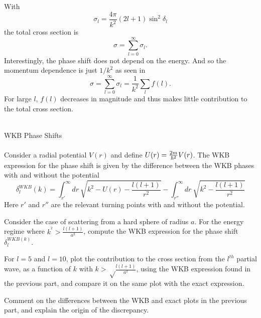 \documentclass[10pt,letterpaper]{article}
\begin{document}
	\item
	With
	\[
		\sigma_l = \frac{4\pi}{k^2}(2l+1)\sin^2\delta_l
	\]
	the total cross section is
	\[
		\sigma = \sum_{l=0}^\infty \sigma_l .
	\]
	Interestingly, the phase shift does not depend on the energy. And so the momentum dependence is
	just $1/k^2$ as seen in 
	\[
		\sigma = \sum_{l=0}^\infty \sigma_l = \frac{1}{k^2}\sum_l f(l).
	\]
	For large $l$, $f(l)$ decreases in magnitude and thus makes little contribution to the total
	cross section. 
	\\
	\\
	\eenum 

	\item{WKB Phase Shifts}
	\\ \\
	Consider a radial potential $V(r)$ and define $U(r) = \frac{2m}{\hbar^2}V(r)$. The WKB expression for the phase 
	shift is given by the difference between the WKB phases with and without the potential
	\[
		\delta_l^{WKB}(k) = \int_{r'}^{\infty} dr\ \sqrt{k^2-U(r)-\frac{l(l+1)}{r^2}} - \int_{r''}^{\infty} dr\ 
		\sqrt{k^2-\frac{l(l+1)}{r^2}}
	\]
	Here $r'$ and $r''$ are the relevant turning points with and without the potential.
	\benum
	\item
	Consider the case of scattering from a hard sphere of radius $a$. For the energy regime where 
	$k^^2>\frac{l(l+1)}{a^2}$, compute the WKB expression for the phase shift $\delta_l^{WKB(k)}$. 
	\item
	For $l=5$ and $l=10$, plot the contribution to the cross section from the $l^{th}$ partial wave, as a function of
	$k$ with $k>\sqrt\frac{l(l+1)}{a^2}$, using the WKB expression found in the previous part, and compare it on the
	same plot with the exact expression.
	\item
	Comment on the differences between the WKB and exact plots in the previous part, and explain the origin
	of the discrepancy. 
	\\
	\\
	\eenum
	
\end{document}
